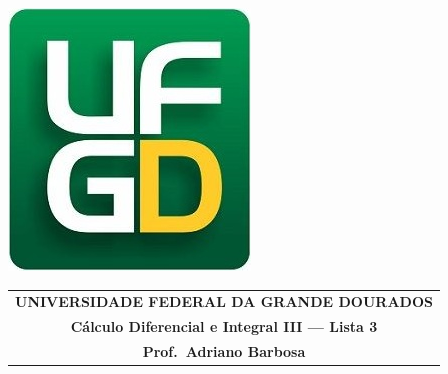 \documentclass[a4paper,5pt]{amsbook}
\begin{document}
\thispagestyle{empty}
\pagestyle{empty}
\begin{minipage}[h]{0.14\textwidth}
	\includegraphics[scale=0.24]{../../ufgd.png}
\end{minipage}
\begin{minipage}[h]{\textwidth}
\begin{tabular}{c}
{{\bf UNIVERSIDADE FEDERAL DA GRANDE DOURADOS}}\\
{{\bf C\'alculo Diferencial e Integral III --- Lista 3}}\\
{{\bf Prof.\ Adriano Barbosa}}\\
\end{tabular}
\vspace{-0.45cm}
%
\end{minipage}

\end{document}
